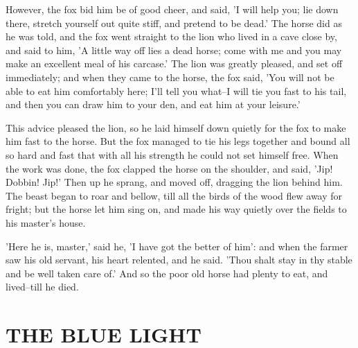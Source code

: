 \documentclass[12pt]{book}
\begin{document}
However, the fox bid him be of good cheer, and said, 'I will help you;
lie down there, stretch yourself out quite stiff, and pretend to be
dead.' The horse did as he was told, and the fox went straight to the
lion who lived in a cave close by, and said to him, 'A little way off
lies a dead horse; come with me and you may make an excellent meal of
his carcase.' The lion was greatly pleased, and set off immediately;
and when they came to the horse, the fox said, 'You will not be able
to eat him comfortably here; I'll tell you what--I will tie you fast
to his tail, and then you can draw him to your den, and eat him at
your leisure.'

This advice pleased the lion, so he laid himself down quietly for the
fox to make him fast to the horse. But the fox managed to tie his legs
together and bound all so hard and fast that with all his strength he
could not set himself free. When the work was done, the fox clapped
the horse on the shoulder, and said, 'Jip! Dobbin! Jip!' Then up he
sprang, and moved off, dragging the lion behind him. The beast began
to roar and bellow, till all the birds of the wood flew away for
fright; but the horse let him sing on, and made his way quietly over
the fields to his master's house.

'Here he is, master,' said he, 'I have got the better of him': and
when the farmer saw his old servant, his heart relented, and he said.
'Thou shalt stay in thy stable and be well taken care of.' And so the
poor old horse had plenty to eat, and lived--till he died.



\chapter{THE BLUE LIGHT}
\end{document}
